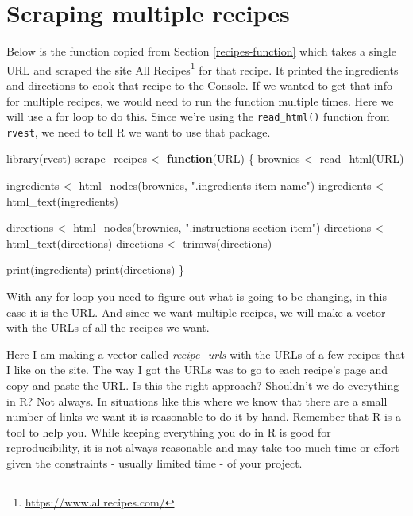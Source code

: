 \documentclass[
]{krantz}
\makeatletter
\newenvironment{Shaded}{\begin{snugshade}}{\end{snugshade}}
\newcommand{\ControlFlowTok}[1]{\textcolor[rgb]{0.27,0.27,0.27}{\textbf{#1}}}
\newcommand{\FunctionTok}[1]{\textcolor[rgb]{0,0,0}{#1}}
\newcommand{\NormalTok}[1]{#1}
\newcommand{\OtherTok}[1]{\textcolor[rgb]{0.37,0.37,0.37}{#1}}
\newcommand{\StringTok}[1]{\textcolor[rgb]{0.5,0.5,0.5}{#1}}
\renewcommand{\href}[2]{#2\footnote{\url{#1}}}
\newenvironment{kframe}{%
\medskip{}
\setlength{\fboxsep}{.8em}
 \def\at@end@of@kframe{}%
 \ifinner\ifhmode%
  \def\at@end@of@kframe{\end{minipage}}%
  \begin{minipage}{\columnwidth}%
 \fi\fi%
 \def\FrameCommand##1{\hskip\@totalleftmargin \hskip-\fboxsep
 \colorbox{shadecolor}{##1}\hskip-\fboxsep
     \hskip-\linewidth \hskip-\@totalleftmargin \hskip\columnwidth}%
 \MakeFramed {\advance\hsize-\width
   \@totalleftmargin\z@ \linewidth\hsize
   \@setminipage}}%
 {\par\unskip\endMakeFramed%
 \at@end@of@kframe}
\renewenvironment{Shaded}{\begin{kframe}}{\end{kframe}}
\makeatother
\begin{document}
\hypertarget{scraping-multiple-recipes}{%
\section{Scraping multiple
recipes}\label{scraping-multiple-recipes}}

Below is the function copied from Section
\ref{recipes-function} which takes a single URL and scraped
the site \href{https://www.allrecipes.com/}{All Recipes} for
that recipe. It printed the ingredients and directions to
cook that recipe to the Console. If we wanted to get that
info for multiple recipes, we would need to run the function
multiple times. Here we will use a for loop to do this.
Since we're using the \texttt{read\_html()} function from
\texttt{rvest}, we need to tell R we want to use that
package.

\begin{Shaded}
\begin{Highlighting}[]
\FunctionTok{library}\NormalTok{(rvest)}
\NormalTok{scrape\_recipes }\OtherTok{\textless{}{-}} \ControlFlowTok{function}\NormalTok{(URL) \{}
\NormalTok{  brownies }\OtherTok{\textless{}{-}} \FunctionTok{read\_html}\NormalTok{(URL)}

\NormalTok{  ingredients }\OtherTok{\textless{}{-}} \FunctionTok{html\_nodes}\NormalTok{(brownies, }\StringTok{".ingredients{-}item{-}name"}\NormalTok{)}
\NormalTok{  ingredients }\OtherTok{\textless{}{-}} \FunctionTok{html\_text}\NormalTok{(ingredients)}

\NormalTok{  directions }\OtherTok{\textless{}{-}} \FunctionTok{html\_nodes}\NormalTok{(brownies, }\StringTok{".instructions{-}section{-}item"}\NormalTok{)}
\NormalTok{  directions }\OtherTok{\textless{}{-}} \FunctionTok{html\_text}\NormalTok{(directions)}
\NormalTok{  directions }\OtherTok{\textless{}{-}} \FunctionTok{trimws}\NormalTok{(directions)}

  \FunctionTok{print}\NormalTok{(ingredients)}
  \FunctionTok{print}\NormalTok{(directions)}
\NormalTok{\}}
\end{Highlighting}
\end{Shaded}

With any for loop you need to figure out what is going to be
changing, in this case it is the URL. And since we want
multiple recipes, we will make a vector with the URLs of all
the recipes we want.

Here I am making a vector called \emph{recipe\_urls} with
the URLs of a few recipes that I like on the site. The way I
got the URLs was to go to each recipe's page and copy and
paste the URL. Is this the right approach? Shouldn't we do
everything in R? Not always. In situations like this where
we know that there are a small number of links we want it is
reasonable to do it by hand. Remember that R is a tool to
help you. While keeping everything you do in R is good for
reproducibility, it is not always reasonable and may take
too much time or effort given the constraints - usually
limited time - of your project.
\end{document}
